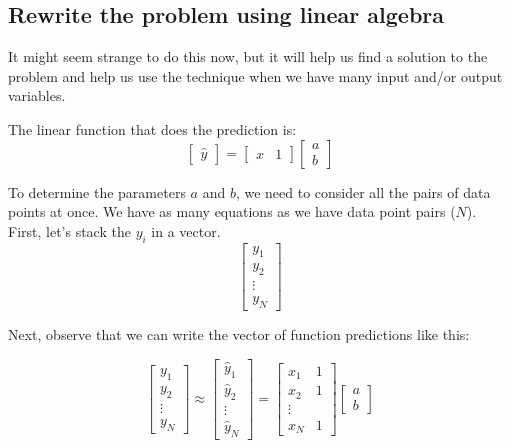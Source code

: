 \documentclass[11pt]{article}
\newcommand\yhat{\hat{y}}
\begin{document}
\subsection{Rewrite the problem using linear algebra}

It might seem strange to do this now, but it will help us find a solution
to the problem and help us use the technique when we have many input
and/or output variables.

The linear function that does the prediction is:
\begin{equation}
    \begin{bmatrix}
        \yhat
    \end{bmatrix}
    = 
    \begin{bmatrix}
        x & 1 
    \end{bmatrix}
    \begin{bmatrix}
        a \\ b
    \end{bmatrix}
\end{equation}

To determine the parameters $a$ and $b$, we need to consider all the
pairs of data points at once. We have as many equations as we have data
point pairs ($N$).  First, let's stack the $y_i$ in a vector.
\begin{equation}
    \begin{bmatrix}
        y_1  \\
        y_2 \\
        \vdots \\
        y_N
    \end{bmatrix}
\end{equation}

Next, observe that we can write the vector of function predictions like this:

\begin{equation}
    \begin{bmatrix}
        y_1 \\
        y_2 \\
        \vdots \\
        y_N
    \end{bmatrix}
    \approx 
    \begin{bmatrix}
        \yhat_1 \\
        \yhat_2 \\
        \vdots \\
        \yhat_N
    \end{bmatrix}
    =
    \begin{bmatrix}
        x_1 & 1 \\
        x_2 & 1 \\
        \vdots \\
        x_N & 1
    \end{bmatrix}
    \begin{bmatrix}
        a \\ b
    \end{bmatrix}
\end{equation}
\end{document}

